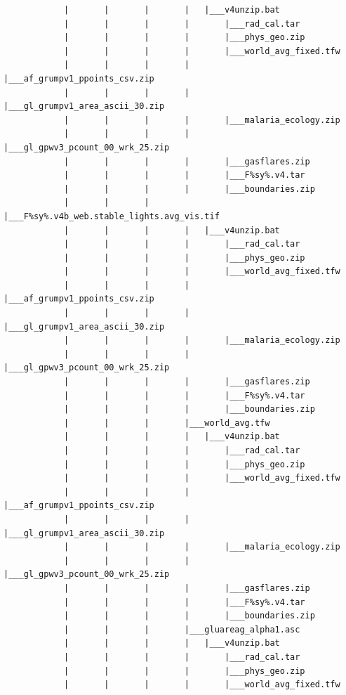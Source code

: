 \documentclass[
]{book}
\begin{document}
\begin{verbatim}
            |       |       |       |   |___v4unzip.bat
            |       |       |       |       |___rad_cal.tar
            |       |       |       |       |___phys_geo.zip
            |       |       |       |       |___world_avg_fixed.tfw
            |       |       |       |       |___af_grumpv1_ppoints_csv.zip
            |       |       |       |       |___gl_grumpv1_area_ascii_30.zip
            |       |       |       |       |___malaria_ecology.zip
            |       |       |       |       |___gl_gpwv3_pcount_00_wrk_25.zip
            |       |       |       |       |___gasflares.zip
            |       |       |       |       |___F%sy%.v4.tar
            |       |       |       |       |___boundaries.zip
            |       |       |       |___F%sy%.v4b_web.stable_lights.avg_vis.tif
            |       |       |       |   |___v4unzip.bat
            |       |       |       |       |___rad_cal.tar
            |       |       |       |       |___phys_geo.zip
            |       |       |       |       |___world_avg_fixed.tfw
            |       |       |       |       |___af_grumpv1_ppoints_csv.zip
            |       |       |       |       |___gl_grumpv1_area_ascii_30.zip
            |       |       |       |       |___malaria_ecology.zip
            |       |       |       |       |___gl_gpwv3_pcount_00_wrk_25.zip
            |       |       |       |       |___gasflares.zip
            |       |       |       |       |___F%sy%.v4.tar
            |       |       |       |       |___boundaries.zip
            |       |       |       |___world_avg.tfw
            |       |       |       |   |___v4unzip.bat
            |       |       |       |       |___rad_cal.tar
            |       |       |       |       |___phys_geo.zip
            |       |       |       |       |___world_avg_fixed.tfw
            |       |       |       |       |___af_grumpv1_ppoints_csv.zip
            |       |       |       |       |___gl_grumpv1_area_ascii_30.zip
            |       |       |       |       |___malaria_ecology.zip
            |       |       |       |       |___gl_gpwv3_pcount_00_wrk_25.zip
            |       |       |       |       |___gasflares.zip
            |       |       |       |       |___F%sy%.v4.tar
            |       |       |       |       |___boundaries.zip
            |       |       |       |___gluareag_alpha1.asc
            |       |       |       |   |___v4unzip.bat
            |       |       |       |       |___rad_cal.tar
            |       |       |       |       |___phys_geo.zip
            |       |       |       |       |___world_avg_fixed.tfw

\end{verbatim}
\end{document}
